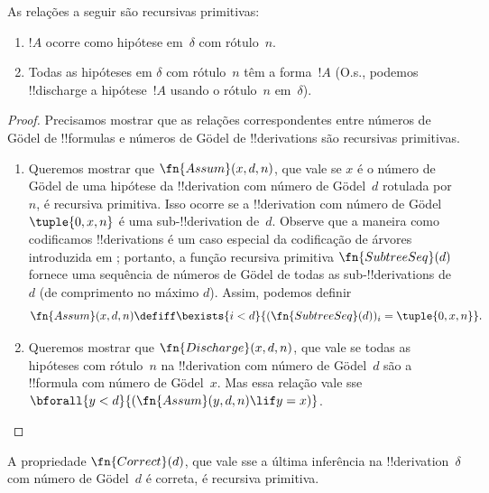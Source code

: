 \documentclass[../../../include/open-logic-section]{subfiles}
\begin{document}
\begin{prop}
  As relações a seguir são recursivas primitivas:
  \begin{enumerate}
  \item $!A$ ocorre como hipótese em~$\delta$ com rótulo~$n$.
  \item Todas as hipóteses em $\delta$ com rótulo~$n$ têm a forma~$!A$
    (O.s.\@, podemos !!{discharge} a hipótese~$!A$ usando o rótulo~$n$
    em~$\delta$).
  \end{enumerate}
\end{prop}

\begin{proof}
  Precisamos mostrar que as relações correspondentes entre números de
  G\"odel de !!{formula}s e números de G\"odel de !!{derivation}s são
  recursivas primitivas.
  \begin{enumerate}
  \item Queremos mostrar que $\fn{Assum}(x, d, n)$, que vale se $x$ é
    o número de G\"odel de uma hipótese da !!{derivation} com número de
    G\"odel~$d$ rotulada por~$n$, é recursiva primitiva. Isso ocorre se
    a !!{derivation} com número de G\"odel~$\tuple{0, x, n}$ é uma
    sub-!!{derivation} de~$d$. Observe que a maneira como codificamos
    !!{derivation}s é um caso especial da codificação de árvores
    introduzida em ; portanto, a função
    recursiva primitiva $\fn{SubtreeSeq}(d)$ fornece uma sequência de
    números de G\"odel de todas as sub-!!{derivation}s de~$d$ (de
    comprimento no máximo $d$). Assim, podemos definir
    \[
    \fn{Assum}(x, d, n) \defiff \bexists{i<d}{(\fn{SubtreeSeq}(d))_i =
      \tuple{0, x, n}}.
    \]
  \item Queremos mostrar que $\fn{Discharge}(x, d, n)$, que vale se
    todas as hipóteses com rótulo~$n$ na !!{derivation} com número de
    G\"odel~$d$ são a !!{formula} com número de G\"odel~$x$. Mas essa
    relação vale sse $\bforall{y<d}{(\fn{Assum}(y, d, n) \lif y = x)}$.
  \end{enumerate}
\end{proof}

\begin{prop}
  A propriedade $\fn{Correct}(d)$, que vale sse a última inferência na
  !!{derivation}~$\delta$ com número de G\"odel~$d$ é correta, é
  recursiva primitiva.
\end{prop}
\end{document}
